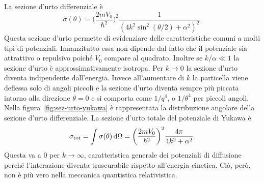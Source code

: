 \documentclass[a4paper,fleqn,twoside,12pt]{article}
\newcommand*{\dd}{\mathop{}\!\mathrm{d}} %
\begin{document}
La sezione d'urto differenziale è
\begin{equation}
  \label{eq:sezione-yukawa}
  \sigma(\theta) = \bigg(\frac{2mV_{0}}{\hslash^{2}}\bigg)^{2}
  \frac{1}{(4k^{2}\sin^{2}(\theta/2) + \alpha^{2})^{2}}.
\end{equation}
Questa sezione d'urto permette di evidenziare delle caratteristiche comuni a
molti tipi di potenziali.  Innanzitutto essa non dipende dal fatto che il
potenziale sia attrattivo o repulsivo poiché $V_{0}$ compare al quadrato.
Inoltre se $k/\alpha \ll 1$ la sezione d'urto è approssimativamente isotropa.
Per $k \to 0$ la sezione d'urto diventa indipendente dall'energia.  Invece
all'aumentare di $k$ la particella viene deflessa solo di angoli piccoli e la
sezione d'urto diventa sempre più piccata intorno alla direzione $\theta = 0$ e
si comporta come $1/q^{4}$, o $1/\theta^{4}$ per piccoli angoli.  Nella
figura~\ref{fig:sez-urto-yukawa} è rappresentata la distribuzione angolare della
sezione d'urto differenziale.  La sezione d'urto totale del potenziale di Yukawa
è
\begin{equation}
  \sigma_{\textup{tot}} = \int \sigma(\theta) \dd\Omega =
  \bigg(\frac{2mV_{0}}{\hslash^{2}}\bigg)^{2} \frac{4\pi}{4k^{2} + \alpha^{2}}.
\end{equation}
Questa va a $0$ per $k \to \infty$, caratteristica generale dei potenziali di
diffusione perché l'interazione diventa trascurabile rispetto all'energia
cinetica.  Ciò, però, non è più vero nella meccanica quantistica relativistica.
\end{document}
